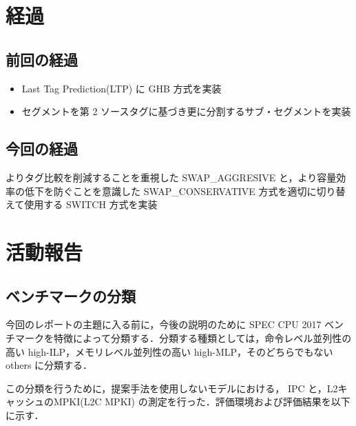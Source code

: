 \documentclass[twocolumn]{jsarticle}
\begin{document}
  \section{経過}

  \subsection{前回の経過}
  \begin{itemize}
    \item Last Tag Prediction(LTP) に GHB 方式を実装
    \item セグメントを第 2 ソースタグに基づき更に分割するサブ・セグメントを実装
  \end{itemize}
  \subsection{今回の経過}
    よりタグ比較を削減することを重視した SWAP\_AGGRESIVE と，より容量効率の低下を防ぐことを意識した SWAP\_CONSERVATIVE 方式を適切に切り替えて使用する SWITCH 方式を実装 

  \section{活動報告}
  \subsection{ベンチマークの分類}
  \label{sec:class}
  今回のレポートの主題に入る前に，今後の説明のために SPEC CPU 2017 ベンチマークを特徴によって分類する．分類する種類としては，命令レベル並列性の高い high-ILP，メモリレベル並列性の高い high-MLP，そのどちらでもない others に分類する．

  この分類を行うために，提案手法を使用しないモデルにおける， IPC と，L2キャッシュのMPKI(L2C MPKI) の測定を行った．評価環境および評価結果を以下に示す．
\end{document}
